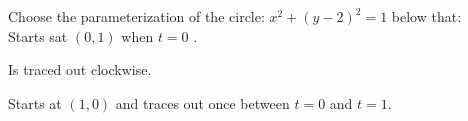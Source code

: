 \documentclass{ximera}
\begin{document}
\begin{exercise}

Choose the parameterization of the circle: $x^2 +(y-2)^2 =1$ below that: \\
Starts sat $(0,1)$ when $t=0$ .

\begin{multipleChoice}
\end{multipleChoice}

\begin{exercise}
Is traced out clockwise.

\begin{multipleChoice}
\end{multipleChoice}

\begin{exercise}
Starts at $(1,0)$ and traces out once between $t=0$ and $t=1$.

\begin{multipleChoice}
\end{multipleChoice}

\end{exercise}
\end{exercise}
\end{exercise}
\end{document}
